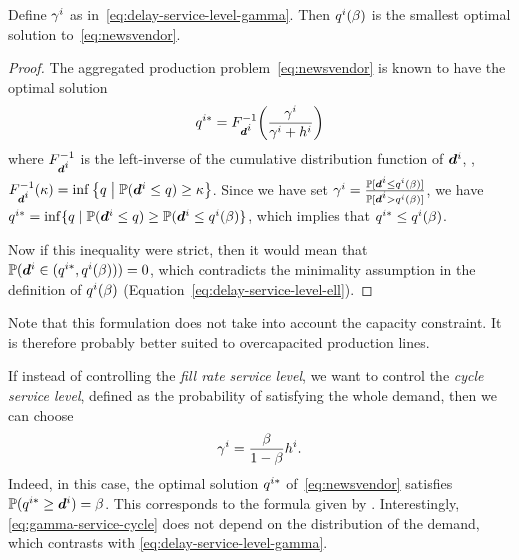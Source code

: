 \begin{prop}\label{prop:vendor}
Define $\gamma^i$ as in~\eqref{eq:delay-service-level-gamma}.
Then $q^i(\beta)$ is the smallest optimal solution to~\eqref{eq:newsvendor}.
\end{prop}


\begin{proof}
The aggregated production problem~\eqref{eq:newsvendor} is known to have the optimal solution
\begin{equation}
  \quantity^{i*} = F_{\va d^i}^{-1}\bracket{\frac{\backorder^i}{\backorder^i+h^i}}
\end{equation}
where $F_{\va d^i}^{-1}$ is the left-inverse of the cumulative distribution function of $\va d^i$,
\ie, $F_{\va d^i}^{-1}(\kappa) = \inf\crbracket{ \quantity\; \big| \; \PP(\va d^i \leq \quantity) \geq \kappa}$.
Since we have set $\backorder^i=\frac{\PP[\va d^i\leq \quantity^i(\servicelvl)]}{\PP[\va d^i>\quantity^i(\servicelvl)]}$,
we have $\quantity^{i*}=\inf\{\quantity \; | \; \PP(\va d^i \leq \quantity) \geq \PP(\va d^i \leq \quantity^i(\beta) \}$, which implies that $q^{i*}\leq q^i(\beta)$.


Now if this inequality were strict, then it would mean that $\PP(\va\demand^i\in(\quantity^{i*},\quantity^i(\beta)))=0$, which contradicts the minimality assumption in the definition of $q^i(\beta)$ (Equation~\eqref{eq:delay-service-level-ell}).
\end{proof}


Note that this formulation does not take into account the capacity constraint.
It is therefore probably better suited to overcapacited production lines.


\begin{rmq}
If instead of controlling the {\em fill rate service level}, we want to control the {\em cycle service level}, defined as the probability of satisfying the whole demand, then we can choose
\begin{equation}
\label{eq:gamma-service-cycle}
\gamma^i = \frac{\beta}{1-\beta} h^i.
\end{equation}
Indeed, in this case, the optimal solution $q^{i*}$ of~\eqref{eq:newsvendor} satisfies $\PP(\quantity^{i*} \geq \va d^i) = \servicelvl$.
This corresponds to the formula given by \citet{vanHoutum2000}.
Interestingly, \cref{eq:gamma-service-cycle} does not depend on the distribution of the demand, which contrasts with \cref{eq:delay-service-level-gamma}.
\end{rmq}


